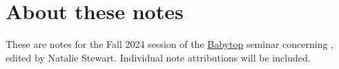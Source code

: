 \documentclass[10pt]{amsart}
\begin{document}
\begin{abstract} 
  Notes from the Fall 2024 session of Babytop. Last compiled: \today
\end{abstract}

\maketitle

\toc


\setlength{\parskip}{0.2em}

\section*{About these notes}

These are notes for the Fall 2024 session of the \href{https://math.mit.edu/topology/babytop/index.html}{Babytop} seminar concerning \cite{HHR}, edited by Natalie Stewart.
Individual note attributions will be included.


\printbibliography
\end{document}
